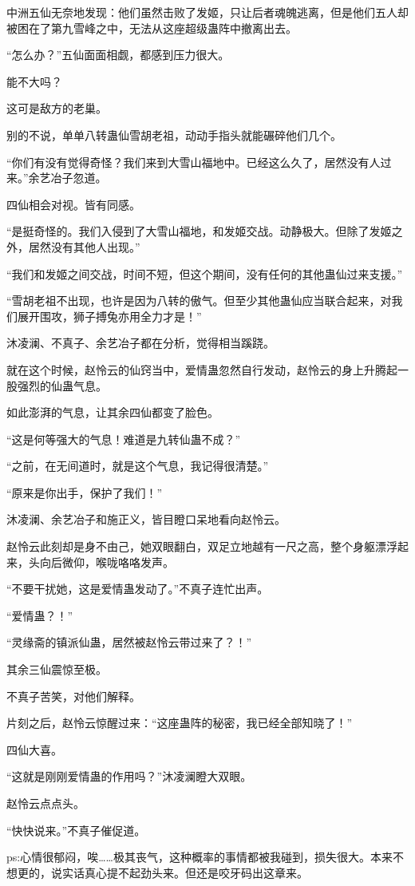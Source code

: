 \begin{this_body}
中洲五仙无奈地发现：他们虽然击败了发姬，只让后者魂魄逃离，但是他们五人却被困在了第九雪峰之中，无法从这座超级蛊阵中撤离出去。

“怎么办？”五仙面面相觑，都感到压力很大。

能不大吗？

这可是敌方的老巢。

别的不说，单单八转蛊仙雪胡老祖，动动手指头就能碾碎他们几个。

“你们有没有觉得奇怪？我们来到大雪山福地中。已经这么久了，居然没有人过来。”余艺冶子忽道。

四仙相会对视。皆有同感。

“是挺奇怪的。我们入侵到了大雪山福地，和发姬交战。动静极大。但除了发姬之外，居然没有其他人出现。”

“我们和发姬之间交战，时间不短，但这个期间，没有任何的其他蛊仙过来支援。”

“雪胡老祖不出现，也许是因为八转的傲气。但至少其他蛊仙应当联合起来，对我们展开围攻，狮子搏兔亦用全力才是！”

沐凌澜、不真子、余艺冶子都在分析，觉得相当蹊跷。

就在这个时候，赵怜云的仙窍当中，爱情蛊忽然自行发动，赵怜云的身上升腾起一股强烈的仙蛊气息。

如此澎湃的气息，让其余四仙都变了脸色。

“这是何等强大的气息！难道是九转仙蛊不成？”

“之前，在无间道时，就是这个气息，我记得很清楚。”

“原来是你出手，保护了我们！”

沐凌澜、余艺冶子和施正义，皆目瞪口呆地看向赵怜云。

赵怜云此刻却是身不由己，她双眼翻白，双足立地越有一尺之高，整个身躯漂浮起来，头向后微仰，喉咙咯咯发声。

“不要干扰她，这是爱情蛊发动了。”不真子连忙出声。

“爱情蛊？！”

“灵缘斋的镇派仙蛊，居然被赵怜云带过来了？！”

其余三仙震惊至极。

不真子苦笑，对他们解释。

片刻之后，赵怜云惊醒过来：“这座蛊阵的秘密，我已经全部知晓了！”

四仙大喜。

“这就是刚刚爱情蛊的作用吗？”沐凌澜瞪大双眼。

赵怜云点点头。

“快快说来。”不真子催促道。

ps:心情很郁闷，唉……极其丧气，这种概率的事情都被我碰到，损失很大。本来不想更的，说实话真心提不起劲头来。但还是咬牙码出这章来。

\end{this_body}

